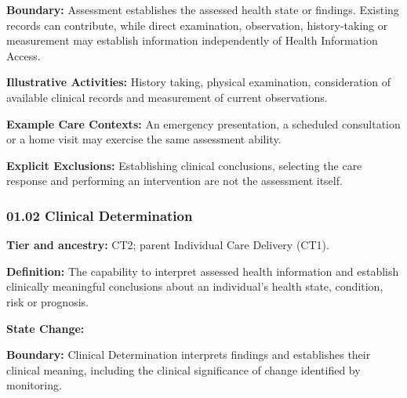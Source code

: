 \label{rad:business:170}

\textbf{Boundary:} Assessment establishes the assessed health state or findings. Existing records can contribute, while direct examination, observation, history-taking or measurement may establish information independently of Health Information Access.

\label{rad:business:175}

\textbf{Illustrative Activities:} History taking, physical examination, consideration of available clinical records and measurement of current observations.

\label{rad:business:178}

\textbf{Example Care Contexts:} An emergency presentation, a scheduled consultation or a home visit may exercise the same assessment ability.

\label{rad:business:181}

\textbf{Explicit Exclusions:} Establishing clinical conclusions, selecting the care response and performing an intervention are not the assessment itself.

\label{rad:business:184}



\label{rad:business:186}
\subsubsection*{01.02 Clinical Determination}
\label{rad:business:188}

\textbf{Tier and ancestry:} CT2; parent Individual Care Delivery (CT1).

\label{rad:business:190}

\textbf{Definition:} The capability to interpret assessed health information and establish clinically meaningful conclusions about an individual's health state, condition, risk or prognosis.

\label{rad:business:194}

\textbf{State Change:} \texttt{}

\label{rad:business:196}

\textbf{Boundary:} Clinical Determination interprets findings and establishes their clinical meaning, including the clinical significance of change identified by monitoring.

\label{rad:business:200}

